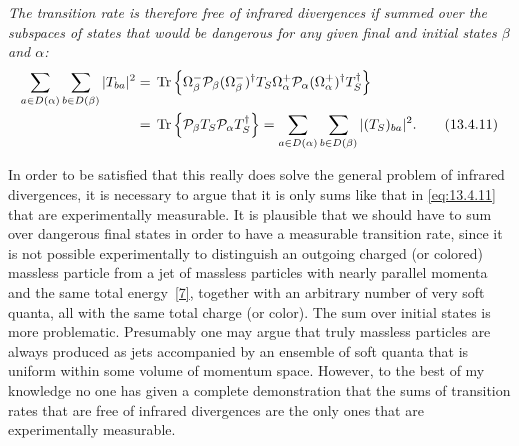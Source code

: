 \emph{The transition rate is therefore free of infrared divergences if
summed over the subspaces of states that would be dangerous for any given
final and initial states $\beta$ and $\alpha$:}
\begin{align}
\sum_{a\in D(\alpha)}\sum_{b\in D(\beta)}|T_{ba}|^2
={}&\operatorname{Tr}\left\{
\Omega_\beta^-\mathcal P_\beta(\Omega_\beta^-)^\dagger
T_S\Omega_\alpha^+\mathcal P_\alpha(\Omega_\alpha^+)^\dagger T_S^\dagger
\right\}\notag\\
={}&\operatorname{Tr}\left\{\mathcal P_\beta T_S
\mathcal P_\alpha T_S^\dagger\right\}
=\sum_{a\in D(\alpha)}\sum_{b\in D(\beta)}|(T_S)_{ba}|^2.
\tag{13.4.11}\label{eq:13.4.11}
\end{align}

In order to be satisfied that this really does solve the general problem of
infrared divergences, it is necessary to argue that it is only sums like that
in \eqref{eq:13.4.11} that are experimentally measurable. It is
plausible that we should have to sum over dangerous final states in order to
have a measurable transition rate, since it is not possible experimentally to
distinguish an outgoing charged (or colored) massless particle from a jet of
massless particles with nearly parallel momenta and the same total
energy~\hyperref[ref:13.7]{[7]}, together with an arbitrary number of very
soft quanta, all with the same total charge (or color). The sum over initial
states is more problematic. Presumably one may argue that truly massless
particles are always produced as jets accompanied by an ensemble of soft
quanta that is uniform within some volume of momentum space. However, to the
best of my knowledge no one has given a complete demonstration that the sums
of transition rates that are free of infrared divergences are the only ones
that are experimentally measurable.

